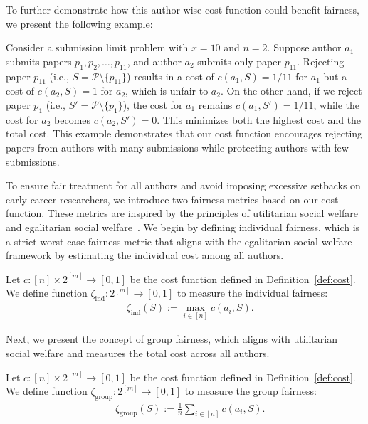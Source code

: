 To further demonstrate how this author-wise cost function could benefit fairness, we present the following example:
\begin{example}
    Consider a submission limit problem with $x = 10$ and $n = 2$. Suppose author $a_1$ submits papers $p_1, p_2, \ldots, p_{11}$, and author $a_2$ submits only paper $p_{11}$. Rejecting paper $p_{11}$ (i.e., $S = \mathcal{P} \setminus \{p_{11}\}$) results in a cost of $c(a_1, S) = 1/11$ for $a_1$ but a cost of $c(a_2, S) = 1$ for $a_2$, which is unfair to $a_2$. On the other hand, if we reject paper $p_1$ (i.e., $S' = \mathcal{P} \setminus \{p_1\}$), the cost for $a_1$ remains $c(a_1, S') = 1/11$, while the cost for $a_2$ becomes $c(a_2, S') = 0$. This minimizes both the highest cost and the total cost. This example demonstrates that our cost function encourages rejecting papers from authors with many submissions while protecting authors with few submissions.
\end{example}

To ensure fair treatment for all authors and avoid imposing excessive setbacks on early-career researchers, we introduce two fairness metrics based on our cost function. These metrics are inspired by the principles of utilitarian social welfare and egalitarian social welfare~\cite{ams24}. We begin by defining individual fairness, which is a strict worst-case fairness metric that aligns with the egalitarian social welfare framework by estimating the individual cost among all authors.

\begin{definition}\label{def:individual_fair}
Let $c: [n] \times 2^{[m]} \to [0,1] $ be the cost function defined in Definition~\ref{def:cost}.
We define function $\zeta_{\mathrm{ind}}: 2^{[m]} \to [0,1]$ to measure the individual fairness:
\begin{align*}
    & ~ \zeta_{\mathrm{ind}}(S) := \max_{i \in [n]} c(a_i,S).
\end{align*}
\end{definition}
Next, we present the concept of group fairness, which aligns with utilitarian social welfare and measures the total cost across all authors.

\begin{definition}\label{def:group_fair}
Let $c: [n] \times 2^{[m]} \to [0,1] $ be the cost function defined in Definition~\ref{def:cost}.
We define function $\zeta_{\mathrm{group}}: 2^{[m]} \to [0,1]$ to measure the group fairness:
\begin{align*}
    & ~ \zeta_{\mathrm{group}}(S) := \frac{1}{n}\sum_{i \in [n]} c(a_i,S).
\end{align*}
 \end{definition}

